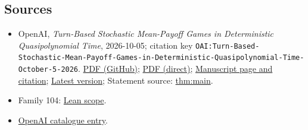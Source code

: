 \documentclass[11pt]{article}
\begin{document}
\subsection{Sources}
\begin{itemize}
\item OpenAI, \emph{Turn-Based Stochastic Mean-Payoff Games in Deterministic Quasipolynomial Time}, 2026-10-05; citation key \texttt{OAI:Turn-Based-Stochastic-Mean-Payoff-Games-in-Deterministic-Quasipolynomial-Time-October-5-2026}. \href{https://github.com/openai/math/blob/adc7f1241b42e322a6451854ab7e4b4c146bf78a/preprints/Turn-Based-Stochastic-Mean-Payoff-Games-in-Deterministic-Quasipolynomial-Time-October-5-2026/stochastic-mean-payoff-games.pdf}{PDF (GitHub)}; \href{https://github.com/openai/math/raw/adc7f1241b42e322a6451854ab7e4b4c146bf78a/preprints/Turn-Based-Stochastic-Mean-Payoff-Games-in-Deterministic-Quasipolynomial-Time-October-5-2026/stochastic-mean-payoff-games.pdf}{PDF (direct)}; \href{https://github.com/openai/math/blob/adc7f1241b42e322a6451854ab7e4b4c146bf78a/preprints/Turn-Based-Stochastic-Mean-Payoff-Games-in-Deterministic-Quasipolynomial-Time-October-5-2026/README.md}{Manuscript page and citation}; \href{https://github.com/openai/math/blob/main/preprints/Turn-Based-Stochastic-Mean-Payoff-Games-in-Deterministic-Quasipolynomial-Time-October-5-2026/stochastic-mean-payoff-games.pdf}{Latest version}; Statement source: \href{https://github.com/openai/math/blob/adc7f1241b42e322a6451854ab7e4b4c146bf78a/preprints/Turn-Based-Stochastic-Mean-Payoff-Games-in-Deterministic-Quasipolynomial-Time-October-5-2026/build/build/sections/introduction.tex\#L49}{thm:main}.
\item Family 104: \href{https://github.com/openai/math/blob/adc7f1241b42e322a6451854ab7e4b4c146bf78a/lean/docs/104.md}{Lean scope}.
\item \href{https://github.com/openai/math/blob/adc7f1241b42e322a6451854ab7e4b4c146bf78a/CONTENTS.md}{OpenAI catalogue entry}.
\end{itemize}
\end{document}
